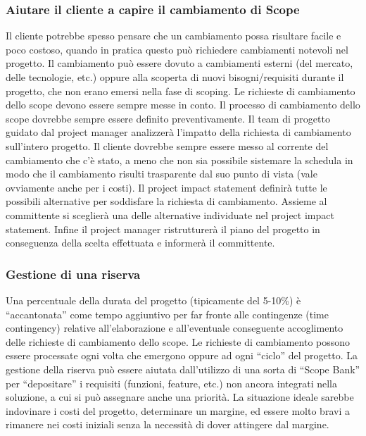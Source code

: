 \subsubsection{Aiutare il cliente a capire il cambiamento di Scope}
Il cliente potrebbe spesso pensare che un cambiamento possa risultare facile e poco costoso, quando in pratica questo può richiedere cambiamenti notevoli nel progetto.\newline
\noindent Il cambiamento può essere dovuto a cambiamenti esterni (del mercato, delle tecnologie, etc.) oppure alla scoperta di nuovi bisogni/requisiti durante il progetto, che non erano emersi nella fase di scoping.
Le richieste di cambiamento dello scope devono essere sempre messe in conto. Il processo di cambiamento dello scope dovrebbe sempre essere definito preventivamente. Il team di progetto guidato dal project manager analizzerà l’impatto della richiesta di cambiamento sull’intero progetto.\newline
Il cliente dovrebbe sempre essere messo al corrente del cambiamento che c'è stato, a meno che non sia possibile sistemare la schedula in modo che il cambiamento risulti trasparente dal suo punto di vista (vale ovviamente anche per i costi).\newline
\noindent Il project impact statement definirà tutte le possibili alternative per soddisfare la richiesta di cambiamento. Assieme al committente si sceglierà una delle alternative individuate nel project impact statement. Infine il project manager ristrutturerà il piano del progetto in conseguenza della scelta effettuata e informerà il committente.
\subsubsection{Gestione di una riserva}
Una percentuale della durata del progetto (tipicamente del 5-10\%) è “accantonata” come tempo aggiuntivo per far fronte alle contingenze (time contingency) relative all’elaborazione e all’eventuale conseguente accoglimento delle richieste di cambiamento dello scope.\newline
\noindent Le richieste di cambiamento possono essere processate ogni volta che emergono oppure ad ogni “ciclo” del progetto. La gestione della riserva può essere aiutata dall’utilizzo di una sorta di “Scope Bank” per “depositare” i requisiti (funzioni, feature, etc.) non ancora integrati nella soluzione, a cui si può assegnare anche una priorità.
La situazione ideale sarebbe indovinare i costi del progetto, determinare un margine, ed essere molto bravi a rimanere nei costi iniziali senza la necessità di dover attingere dal margine.
